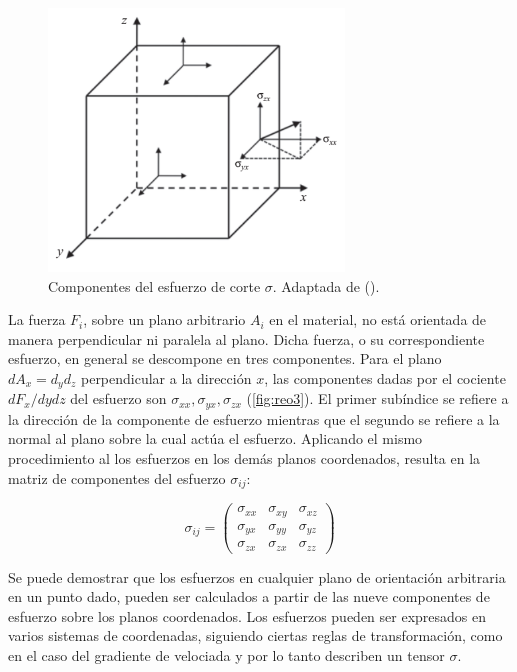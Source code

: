 \begin{figure}\centering
    \includegraphics[width=0.7\textwidth]{Graphics/reo3.png}
    \caption[Componentes del esfuerzo de corte]{Componentes del esfuerzo de corte $\sigma$. Adaptada de ().}
    \label{fig:reo3}
\end{figure}

La fuerza $F_{i}$, sobre un plano arbitrario $A_{i}$ en el material, no está orientada de manera perpendicular ni paralela al plano. Dicha fuerza, o su correspondiente esfuerzo, en general se descompone en tres componentes. Para el plano $dA_{x}=d_{y}d_{z}$ perpendicular a la dirección $x$, las componentes dadas por el cociente $dF_{x}/dydz$ del esfuerzo son $\sigma_{xx},\sigma_{yx},\sigma_{zx}$ (\autoref{fig:reo3}). El primer subíndice se refiere a la dirección de la componente de esfuerzo mientras que el segundo se refiere a la normal al plano sobre la cual actúa el esfuerzo. Aplicando el mismo procedimiento al los esfuerzos en los demás planos coordenados, resulta en la matriz de componentes del esfuerzo $\sigma_{ij}$:

\begin{equation}
\sigma_{ij}=\left( \begin{matrix}
\sigma_{xx} & \sigma_{xy} & \sigma_{xz} \\
\sigma_{yx} & \sigma_{yy} & \sigma_{yz} \\
\sigma_{zx} & \sigma_{zx} & \sigma_{zz}
\end{matrix} \right)
\end{equation}

Se puede demostrar que los esfuerzos en cualquier plano de orientación arbitraria en un punto dado, pueden ser calculados a partir de las nueve componentes de esfuerzo sobre los planos coordenados. Los esfuerzos pueden ser expresados en varios sistemas de coordenadas, siguiendo ciertas reglas de transformación, como en el caso del gradiente de velociada y por lo tanto describen un tensor \textbf{$\sigma$}.

